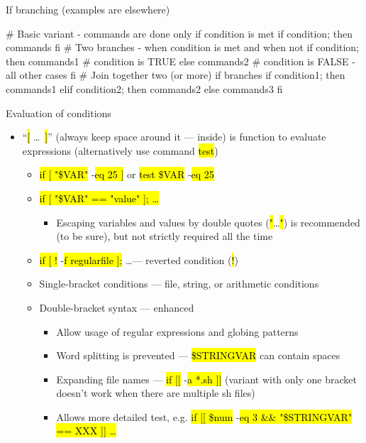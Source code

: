 \documentclass[compress, ucs, xelatex, 11pt, xcolor=svgnames, aspectratio=169,
	hyperref={
		bookmarks=true,
		unicode=true,
		colorlinks=true,
		pdftitle={Linux, command line and MetaCentrum},
		plainpages=false,
		pdfauthor={Vojtech Zeisek},
		pdfsubject={Course about use of Linux command line, writing shell scripts and using MetaCentrum of CESNET},
		pdfcreator={XeLaTeX},
		pdfkeywords={Linux, GNU, BASH, shell, command line, MetaCentrum},
		linkcolor=DarkRed, %
		anchorcolor=DarkBlue, %
		citecolor=Indigo, %
		filecolor=NavyBlue, %
		menucolor=DarkMagenta, %
		urlcolor=DarkBlue, %
		pdftex},
	url={hyphens, lowtilde} %
	]{beamer}
\renewcommand{\texttt}[1]{\hl{\ttfamily #1}}
\begin{document}
\begin{frame}[fragile]{If branching (examples are elsewhere)}
	\begin{bashcode}
    # Basic variant - commands are done only if condition is met
    if condition; then
        commands
      fi
    # Two branches - when condition is met and when not
    if condition; then
        commands1 # condition is TRUE
      else
        commands2 # condition is FALSE - all other cases
      fi
    # Join together two (or more) if branches
    if condition1; then
        commands1
      elif condition2; then
          commands2
        else
          commands3
        fi
	\end{bashcode}
\end{frame}

\begin{frame}[allowframebreaks]{Evaluation of conditions}
	\begin{itemize}
		\item \enquote{\texttt{[} \ldots~\texttt{]}} (always keep space around it --- inside) is function to evaluate expressions (alternatively use command \texttt{test})
		\begin{itemize}
			\item \texttt{if [ "\$VAR"} -\texttt{eq 25 ]} or \texttt{test \$VAR} -\texttt{eq 25}
			\item \texttt{if [ "\$VAR" == "value" ]; \ldots}
			\begin{itemize}
				\item Escaping variables and values by double quotes (\texttt{"}\ldots\texttt{"}) is recommended (to be sure), but not strictly required all the time
			\end{itemize}
			\item \texttt{if [ !} -\texttt{f regularfile ];} \ldots --- reverted condition (\texttt{!})
			\item Single-bracket conditions --- file, string, or arithmetic conditions
			\item Double-bracket syntax --- enhanced
			\begin{itemize}
				\item Allow usage of regular expressions and globing patterns
				\item Word splitting is prevented --- \texttt{\$STRINGVAR} can contain spaces
				\item Expanding file names --- \texttt{if [[} -\texttt{a *.sh ]]} (variant with only one bracket doesn't work when there are multiple sh files)
				\item Allows more detailed test, e.g. \texttt{if [[ \$num} -\texttt{eq 3 \&\& "\$STRINGVAR" == XXX ]] \ldots}

\end{itemize}
\end{itemize}
\end{itemize}
\end{frame}
\end{document}
